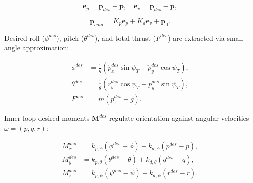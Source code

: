 \begin{equation}
    \mathbf{e}_p = \mathbf{p}_{des} - \mathbf{p}, \quad
    \mathbf{e}_v = \mathbf{\dot{p}}_{des} - \mathbf{\dot{p}},
\end{equation}

\begin{equation}\mathbf{\ddot{p}}_{cmd} = K_p \mathbf{e}_p + K_d \mathbf{e}_v + \mathbf{\ddot{p}}_{\text{ff}}.
\end{equation}

Desired roll ($\phi^{des}$), pitch ($\theta^{des}$), and total thrust ($F^{des}$) are extracted via small-angle approximation:

\begin{equation}
    \begin{split}
        \phi^{des} &= \frac{1}{g} (\ddot{p}^{des}_{x} \sin \psi_T - \ddot{p}^{des}_{y} \cos \psi_T), \\
        \theta^{des} &= \frac{1}{g} (\ddot{r}^{des}_{y} \cos \psi_T + \ddot{p}^{des}_{y} \sin \psi_T), \\
        F^{des} &= m(\ddot{p}^{des}_{z} + g).
    \end{split}
\end{equation}

Inner-loop desired moments $\mathbf{M}^{des}$ regulate orientation against angular velocities $\omega = (p, q, r)$:

\begin{equation}
    \begin{split}        
        M_{x}^{des} &= k_{p, \phi} (\phi^{des} - \phi) + k_{d, \phi} (p^{des} - p), \\
        M_{y}^{des} &= k_{p, \theta} (\theta^{des} - \theta) + k_{d, \theta} (q^{des} - q), \\
        M_{z}^{des} &= k_{p, \psi} (\psi^{des} - \psi) + k_{d, \psi} (r^{des} - r).
    \end{split}
\end{equation}